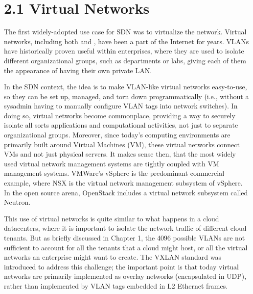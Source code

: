\documentclass[letterpaper,11pt,english]{sphinxmanual}
\begin{document}
\section{2.1 Virtual Networks}
\label{\detokenize{uses:virtual-networks}}
The first widely-adopted use case for SDN was to virtualize the
network. Virtual networks, including both  and , have been a part of
the Internet for years. VLANs have historically proven useful within
enterprises, where they are used to isolate different organizational
groups, such as departments or labs, giving each of them the
appearance of having their own private LAN.

In the SDN context, the idea is to make VLAN-like virtual networks
easy-to-use, so they can be set up, managed, and torn down
programmatically (i.e., without a sysadmin having to manually
configure VLAN tags into network switches). In doing so, virtual
networks become commonplace, providing a way to securely isolate all
sorts applications and computational activities, not just to separate
organizational groups. Moreover, since today’s computing environments
are primarily built around Virtual Machines (VM), these virtual
networks connect VMs and not just physical servers. It makes sense
then, that the most widely used virtual network management systems are
tightly coupled with VM management systems. VMWare’s vSphere is the
predominant commercial example, where NSX is the virtual network
management subsystem of vSphere. In the open source arena, OpenStack
includes a virtual network subsystem called Neutron.

This use of virtual networks is quite similar to what happens in a
cloud datacenters, where it is important to isolate the network
traffic of different cloud tenants. But as briefly discussed in
Chapter 1, the 4096 possible VLANs are not sufficient to account for
all the tenants that a cloud might host, or all the virtual networks
an enterprise might want to create. The VXLAN standard was introduced
to address this challenge; the important point is that today virtual
networks are primarily implemented as overlay networks (encapsulated
in UDP), rather than implemented by VLAN tags embedded in L2 Ethernet
frames.
\end{document}
